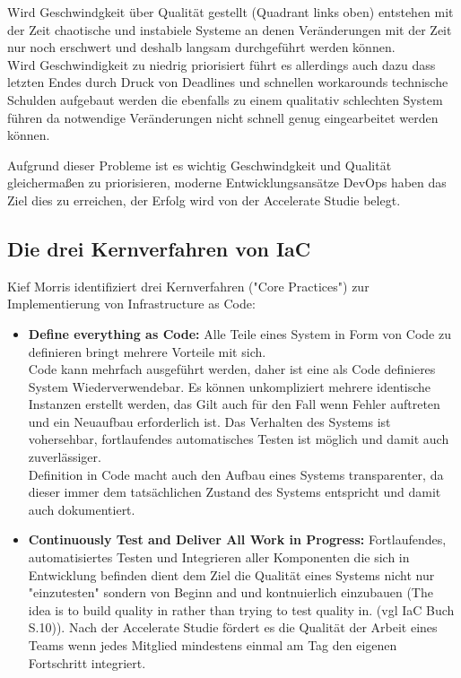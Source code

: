 \begin{spacing}{1.2}
Wird Geschwindgkeit über Qualität gestellt (Quadrant links oben) entstehen
mit der Zeit chaotische und instabiele Systeme an denen Veränderungen mit
der Zeit nur noch erschwert und deshalb langsam durchgeführt werden können.\\
Wird Geschwindigkeit zu niedrig priorisiert führt es allerdings auch dazu
dass letzten Endes durch Druck von Deadlines und schnellen workarounds
technische Schulden aufgebaut werden die ebenfalls zu einem qualitativ
schlechten System führen da notwendige Veränderungen nicht schnell genug
eingearbeitet werden können.

Aufgrund dieser Probleme ist es wichtig Geschwindgkeit und Qualität
gleichermaßen zu priorisieren, moderne Entwicklungsansätze DevOps
haben das Ziel dies zu erreichen, der Erfolg wird von der
Accelerate Studie belegt.

\subsection{Die drei Kernverfahren von IaC}

Kief Morris identifiziert drei Kernverfahren ("Core Practices")
zur Implementierung von Infrastructure as Code:

\begin{itemize} 
  \item \textbf{Define everything as Code:} Alle Teile eines System
  in Form von Code zu definieren bringt mehrere Vorteile mit sich.\\
  Code kann mehrfach ausgeführt werden, daher ist eine als Code
  definieres System Wiederverwendebar. Es können unkompliziert mehrere
  identische Instanzen erstellt werden, das Gilt auch für den Fall
  wenn Fehler auftreten und ein Neuaufbau erforderlich ist.
  Das Verhalten des Systems ist vohersehbar, fortlaufendes automatisches
  Testen ist möglich und damit auch zuverlässiger.\\
  Definition in Code macht auch den Aufbau eines Systems transparenter,
  da dieser immer dem tatsächlichen Zustand des Systems entspricht und
  damit auch dokumentiert.
  
  \item \textbf{Continuously Test and Deliver All Work in Progress:} 
  Fortlaufendes, automatisiertes Testen und Integrieren aller Komponenten
  die sich in Entwicklung befinden dient dem Ziel die Qualität eines
  Systems nicht nur "einzutesten" sondern von Beginn and und kontnuierlich
  einzubauen
  (The idea is to build quality in rather than trying to test quality in.
  (vgl IaC Buch S.10)). Nach der Accelerate Studie fördert es die Qualität
  der Arbeit eines Teams wenn jedes Mitglied mindestens einmal am Tag den
  eigenen Fortschritt integriert.


\end{itemize}
\end{spacing}
